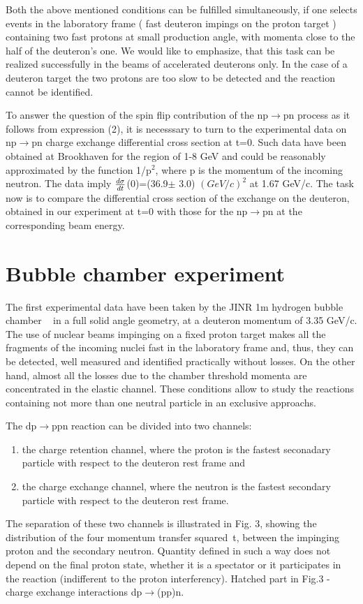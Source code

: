 \documentclass[a4paper,12pt]{article}
\begin{document}
Both the above mentioned conditions can be fulfilled simultaneously, if one
selects events in the laboratory frame ( fast deuteron impings on the proton
target ) containing two fast protons  at small production angle, with momenta
close to the half of the deuteron's one. We would like to emphasize, that this
task can be realized successfully in the beams of accelerated deuterons only.
In the case of a deuteron target the two protons are too slow to be detected
and the reaction cannot be identified.

To answer the question of the spin flip contribution of the np$\to$pn process
as it follows from expression (2), it is
necesssary to turn to the experimental data on np$\to$pn charge exchange
differential cross section at t=0. Such data have been obtained at Brookhaven
\cite{Fri}
for the region of 1-8 GeV and could
be reasonably approximated by the function 1/p$^2$, where p is the momentum
of the incoming
neutron. The data imply ${d\sigma\over dt}$(0)=(36.9$\pm$ 3.0) $(GeV/c)^2$
at 1.67 GeV/c.  The task now is to compare the differential cross section
of the exchange on the deuteron, obtained in our experiment at t=0 with
those for the np$\to$pn at the corresponding beam energy.


\section{Bubble chamber experiment}


\hspace{0.5cm}
The first experimental data have been taken by the JINR 1m hydrogen bubble
chamber ~\cite{gla,Ala} in a full solid angle geometry, at a deuteron momentum of
3.35 GeV/c. The use of nuclear
beams impinging on a fixed proton target makes all the fragments of the
incoming nuclei fast in the laboratory frame and, thus, they can be detected,
well measured and identified practically without losses. On the other hand,
almost all the losses due to the chamber threshold momenta are concentrated
in the elastic channel. These conditions
allow to study the reactions containing not more than one
neutral particle in an exclusive approachs.

The  dp$\to$ppn reaction can be divided
into two channels:\\
\begin{enumerate}
\item the charge retention channel, where the proton is the fastest
  seconadary particle with respect to the deuteron rest frame and
\item the charge exchange channel, where the neutron is the fastest
  secondary particle with respect to the deuteron rest frame.
\end{enumerate}
The separation of these two channels is illustrated in Fig. 3, showing
the distribution of the four momentum transfer squared~t, between the impinging
proton and the secondary neutron. Quantity defined in such a way does not
depend on the final proton state, whether it is
a spectator or it participates in the reaction
(indifferent to the proton interferency). Hatched part in
Fig.3 - charge exchange interactions dp$\to$(pp)n.
\end{document}
